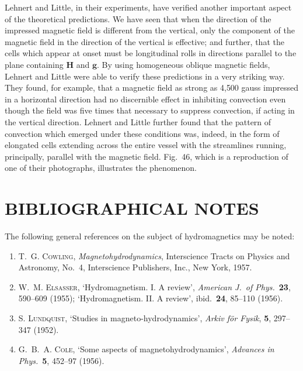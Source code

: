 Lehnert and Little, in their experiments, have verified another important aspect of the theoretical predictions. We have seen that when the direction of the impressed magnetic field is different from the vertical, only the component of the magnetic field in the direction of the vertical is effective; and further, that the cells which appear at onset must be longitudinal rolls in directions parallel to the plane containing $\mathbf{H}$ and $\mathbf{g}$. By using homogeneous oblique magnetic fields, Lehnert and Little were able to verify these predictions in a very striking way. They found, for example, that a magnetic field as strong as 4{,}500 gauss impressed in a horizontal direction had no discernible effect in inhibiting convection even though the field was five times that necessary to suppress convection, if acting in the vertical direction. Lehnert and Little further found that the pattern of convection which emerged under these conditions was, indeed, in the form of elongated cells extending across the entire vessel with the streamlines running, principally, parallel with the magnetic field. Fig.~46, which is a reproduction of one of their photographs, illustrates the phenomenon.


\section*{BIBLIOGRAPHICAL NOTES}

The following general references on the subject of hydromagnetics may be noted:
\begin{enumerate}
\item T.~G. \textsc{Cowling}, \emph{Magnetohydrodynamics}, Interscience Tracts on Physics and Astronomy, No.~4, Interscience Publishers, Inc., New York, 1957.
\item W.~M. \textsc{Elsasser}, `Hydromagnetism. I. A review', \emph{American J.\ of Phys.}\ \textbf{23}, 590--609 (1955); `Hydromagnetism. II. A review', ibid.\ \textbf{24}, 85--110 (1956).
\item S. \textsc{Lundquist}, `Studies in magneto-hydrodynamics', \emph{Arkiv f\"or Fysik}, \textbf{5}, 297--347 (1952).
\item G.~B.~A. \textsc{Cole}, `Some aspects of magnetohydrodynamics', \emph{Advances in Phys.}\ \textbf{5}, 452--97 (1956).
\end{enumerate}

